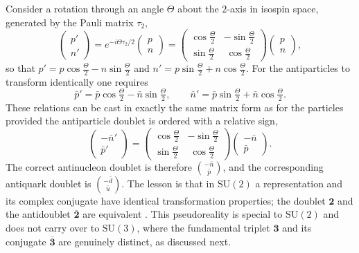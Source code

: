 Consider a rotation through an angle $\Theta$ about the $2$-axis in isospin space,
generated by the Pauli matrix $\tau_2$,
\begin{equation}
    \begin{pmatrix} p' \\ n' \end{pmatrix}
    = e^{-i\Theta\tau_2/2}
    \begin{pmatrix} p \\ n \end{pmatrix}
    = \begin{pmatrix}
        \cos\tfrac{\Theta}{2} & -\sin\tfrac{\Theta}{2} \\[2pt]
        \sin\tfrac{\Theta}{2} & \;\cos\tfrac{\Theta}{2}
      \end{pmatrix}
    \begin{pmatrix} p \\ n \end{pmatrix},
\end{equation}
so that $p' = p\cos\tfrac{\Theta}{2} - n\sin\tfrac{\Theta}{2}$ and $n' =
p\sin\tfrac{\Theta}{2} + n\cos\tfrac{\Theta}{2}$. For the antiparticles to transform
identically one requires
\begin{equation}
    \bar{p}' = \bar{p}\cos\tfrac{\Theta}{2} - \bar{n}\sin\tfrac{\Theta}{2},
    \qquad
    \bar{n}' = \bar{p}\sin\tfrac{\Theta}{2} + \bar{n}\cos\tfrac{\Theta}{2}.
\end{equation}
These relations can be cast in exactly the same matrix form as for the particles
provided the antiparticle doublet is ordered with a relative sign,
\begin{equation}
    \begin{pmatrix} -\bar{n}' \\ \bar{p}' \end{pmatrix}
    = \begin{pmatrix}
        \cos\tfrac{\Theta}{2} & -\sin\tfrac{\Theta}{2} \\[2pt]
        \sin\tfrac{\Theta}{2} & \;\cos\tfrac{\Theta}{2}
      \end{pmatrix}
    \begin{pmatrix} -\bar{n} \\ \bar{p} \end{pmatrix}.
\end{equation}
The correct antinucleon doublet is therefore $\binom{-\bar{n}}{\bar{p}}$, and the
corresponding antiquark doublet is $\binom{-\bar{d}}{\bar{u}}$. The lesson is that in
$\mathrm{SU}(2)$ a representation and its complex conjugate have identical
transformation properties; the doublet $\mathbf{2}$ and the antidoublet
$\overline{\mathbf{2}}$ are equivalent \cite[Ch.~6]{Amsler2018}. This pseudoreality is special
to $\mathrm{SU}(2)$ and does not carry over to $\mathrm{SU}(3)$, where the
fundamental triplet $\mathbf{3}$ and its conjugate $\overline{\mathbf{3}}$ are genuinely
distinct, as discussed next.

